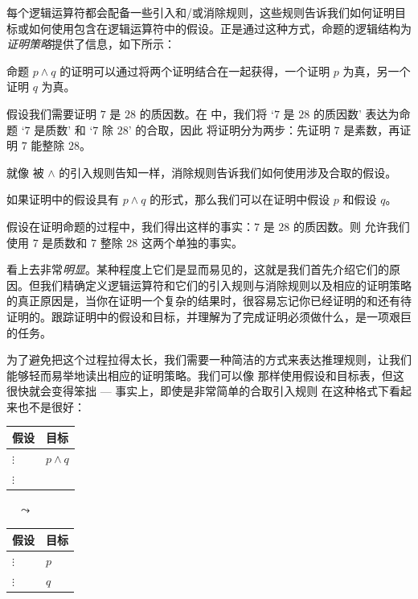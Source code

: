 每个逻辑运算符都会配备一些引入和/或消除规则，这些规则告诉我们如何证明目标或如何使用包含在逻辑运算符中的假设。正是通过这种方式，命题的逻辑结构为\textit{证明策略}提供了信息，如下所示：

\begin{strategy}[合取证明]
\label{strProvingConjunctionsDirect}
命题 $p \wedge q$ 的证明可以通过将两个证明结合在一起获得，一个证明 $p$ 为真，另一个证明 $q$ 为真。
\end{strategy}

\begin{example}
\label{exSevenDividesTwentyEightConjunctionProof}
假设我们需要证明 $7$ 是 $28$ 的质因数。在  中，我们将 `$7$ 是 $28$ 的质因数' 表达为命题 `$7$ 是质数' 和 `$7$ 除 $28$' 的合取，因此  将证明分为两步：先证明 $7$ 是素数，再证明 $7$ 能整除 $28$。
\end{example}

就像  被 $\wedge$ 的引入规则告知一样，消除规则告诉我们如何使用涉及合取的假设。

\begin{strategy}[合取假设]
\label{strAssumingConjunctionsDirect}
如果证明中的假设具有 $p \wedge q$ 的形式，那么我们可以在证明中假设 $p$ 和假设 $q$。
\end{strategy}

\begin{example}
\label{exSevenDividesTwentyEightConjunctionAssumption}
假设在证明命题的过程中，我们得出这样的事实：$7$ 是 $28$ 的质因数。则  允许我们使用 $7$ 是质数和 $7$ 整除 $28$ 这两个单独的事实。
\end{example}

 看上去非常\textit{明显}。某种程度上它们是显而易见的，这就是我们首先介绍它们的原因。但我们精确定义逻辑运算符和它们的引入规则与消除规则以及相应的证明策略的真正原因是，当你在证明一个复杂的结果时，很容易忘记你已经证明的和还有待证明的。跟踪证明中的假设和目标，并理解为了完成证明必须做什么，是一项艰巨的任务。

为了避免把这个过程拉得太长，我们需要一种简洁的方式来表达推理规则，让我们能够轻而易举地读出相应的证明策略。我们可以像  那样使用假设和目标表，但这很快就会变得笨拙 --- 事实上，即使是非常简单的合取引入规则 \introrule{\wedge} 在这种格式下看起来也不是很好：

\begin{center}
\begin{tabular}{C{60pt}|C{60pt}}
{\small \textbf{假设}} & {\small \textbf{目标}} \\ \hline
$\vdots$ & $p \wedge q$ \\
$\vdots$ & ~
\end{tabular}
$\quad \leadsto \quad$
\begin{tabular}{C{60pt}|C{60pt}}
{\small \textbf{假设}} & \small{\textbf{目标}} \\ \hline
$\vdots$ & $p$ \\
$\vdots$ & $q$
\end{tabular}
\end{center}

